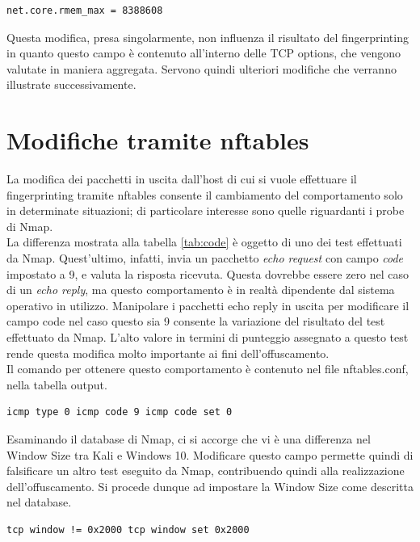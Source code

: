 \begin{lstlisting}[caption={Modifica alla Windows Size massima nel file sysctl.conf}, label=listingscaling]
	net.core.rmem_max = 8388608
\end{lstlisting}

Questa modifica, presa singolarmente, non influenza il risultato del fingerprinting in quanto questo campo è contenuto all'interno delle TCP options, che vengono valutate in maniera aggregata. Servono quindi ulteriori modifiche che verranno illustrate successivamente.

\section{Modifiche tramite nftables}
La modifica dei pacchetti in uscita dall'host di cui si vuole effettuare il fingerprinting tramite nftables consente il cambiamento del comportamento solo in determinate situazioni; di particolare interesse sono quelle riguardanti i probe di Nmap.
\\
La differenza mostrata alla tabella \ref{tab:code} è oggetto di uno dei test effettuati da Nmap. Quest'ultimo, infatti, invia un pacchetto \textit{echo request} con campo \textit{code} impostato a 9, e valuta la risposta ricevuta.
Questa dovrebbe essere zero nel caso di un \textit{echo reply}, ma questo comportamento è in realtà dipendente dal sistema operativo in utilizzo.
Manipolare i pacchetti echo reply in uscita per modificare il campo code nel caso questo sia 9 consente la variazione del risultato del test effettuato da Nmap. L'alto valore in termini di punteggio assegnato a questo test rende questa modifica molto importante ai fini dell'offuscamento.\\
Il comando per ottenere questo comportamento è contenuto nel file nftables.conf, nella tabella output.

\begin{lstlisting}[caption={Modifica del campo code in caso di test Nmap}, label=codice_icmp]
	icmp type 0 icmp code 9 icmp code set 0
\end{lstlisting}

Esaminando il database di Nmap, ci si accorge che vi è una differenza nel Window Size tra Kali e Windows 10. Modificare questo campo permette quindi di falsificare un altro test eseguito da Nmap, contribuendo quindi alla realizzazione dell'offuscamento.
Si procede dunque ad impostare la Window Size come descritta nel database.

\begin{lstlisting}[caption={Modifica della Window Size}, label=listingsize]
	tcp window != 0x2000 tcp window set 0x2000
\end{lstlisting}

